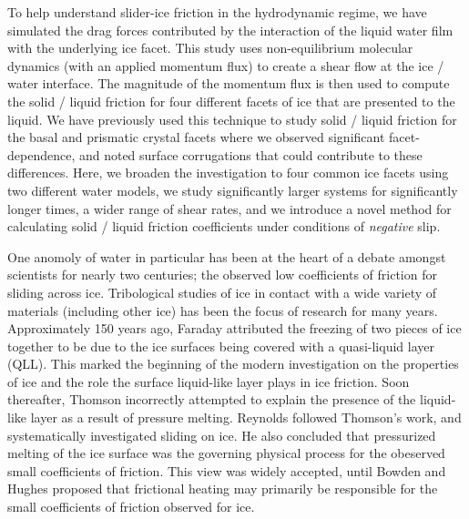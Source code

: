 To help understand slider-ice friction in the hydrodynamic regime, we
have simulated the drag forces contributed by the interaction of the
liquid water film with the underlying ice facet. This study uses
non-equilibrium molecular dynamics (with an applied momentum flux) to
create a shear flow at the ice / water interface. The magnitude of the
momentum flux is then used to compute the solid / liquid friction for
four different facets of ice that are presented to the liquid.  We
have previously used this technique to study solid / liquid friction
for the basal and prismatic crystal facets where we observed
significant facet-dependence, and noted surface corrugations that
could contribute to these differences.\cite{Louden2013a} Here, we
broaden the investigation to four common ice facets using two
different water models, we study significantly larger systems for
significantly longer times, a wider range of shear rates, and we
introduce a novel method for calculating solid / liquid friction
coefficients under conditions of \textit{negative} slip.



One anomoly of water in particular has been at the heart of a debate
amongst scientists for nearly two centuries; the observed low
coefficients of friction for sliding across ice.  Tribological studies of
ice in contact with a wide variety of materials (including other ice)
has been the focus of research for many years.  Approximately 150
years ago, Faraday attributed the freezing of two pieces of ice
together to be due to the ice surfaces being covered with a
quasi-liquid layer (QLL).\cite{Faraday1859} This marked the beginning
of the modern investigation on the properties of ice and the role the
surface liquid-like layer plays in ice friction. Soon thereafter,
Thomson incorrectly attempted to explain the presence of the
liquid-like layer as a result of pressure melting.\cite{Thomson1859}
Reynolds followed Thomson's work, and systematically investigated
sliding on ice. He also concluded that pressurized melting of the ice
surface was the governing physical process for the obeserved small
coefficients of friction.\cite{Reynolds1901} This view was widely
accepted, until Bowden and Hughes proposed that frictional heating may
primarily be responsible for the small coefficients of friction
observed for ice.\cite{Bowden1939}

